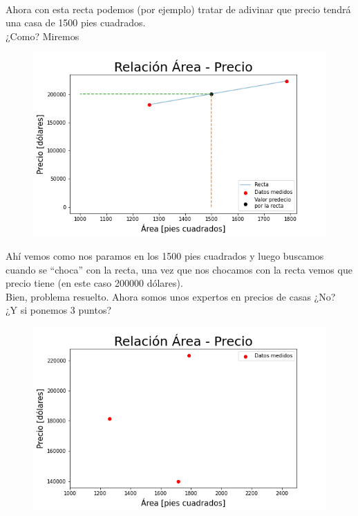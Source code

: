 \documentclass{article}
\begin{document}
\\
Ahora con esta recta podemos (por ejemplo) tratar de adivinar que precio tendrá una casa de 1500 pies cuadrados.\\
¿Como? Miremos
\begin{figure}[h!]
\includegraphics[scale=0.5]{Imagenes/prediccion_valor_1500.png}
\centering
\end{figure}
\newline
Ahí vemos como nos paramos en los 1500 pies cuadrados y luego buscamos cuando se ``choca” con la recta, una vez que nos chocamos con la recta vemos que precio tiene (en este caso 200000 dólares).\\
Bien, problema resuelto. Ahora somos unos expertos en precios de casas ¿No?\\
¿Y si ponemos 3 puntos?\\
\begin{figure}[h]
\includegraphics[scale=0.6]{Imagenes/3_puntos.png}
\centering
\end{figure}
\end{document}
